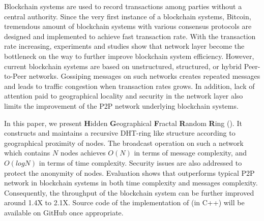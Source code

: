 Blockchain systems are used to record transactions among parties without a central authority. Since the very first instance of a blockchain systems, Bitcoin, tremendous amount of blockchain systems with various consensus protocols are designed and implemented to achieve fast transaction rate. With the transaction rate increasing, experiments and studies show that network layer become the bottleneck on the way to further improve blockchain system efficiency. However, current blockchain systems are based on unstructured, structured, or hybrid Peer-to-Peer networks. Gossiping messages on such networks creates repeated messages and leads to traffic congestion when transaction rates grows. In addition, lack of attention paid to geographical locality and security in the network layer also limits the improvement of the P2P network underlying blockchain systems.

In this paper, we present \textbf{H}idden \textbf{G}eographical \textbf{F}ractal \textbf{R}andom \textbf{R}ing (\xxx). It constructs and maintains a recursive DHT-ring like structure according to geographical proximity of nodes. The broadcast operation on such a network which contains $N$ nodes achieves $O(N)$ in terms of message complexity, and $O(logN)$ in terms of time complexity. Security issues are also addressed to protect the anonymity of nodes. Evaluation shows that \xxx outperforms typical P2P network in blockchain systems in both time complexity and messages complexity. Consequently, the throughput of the blockchain system can be further improved around 1.4X to 2.1X. Source code of the implementation of \xxx (in C++) will be available on GitHub once appropriate.